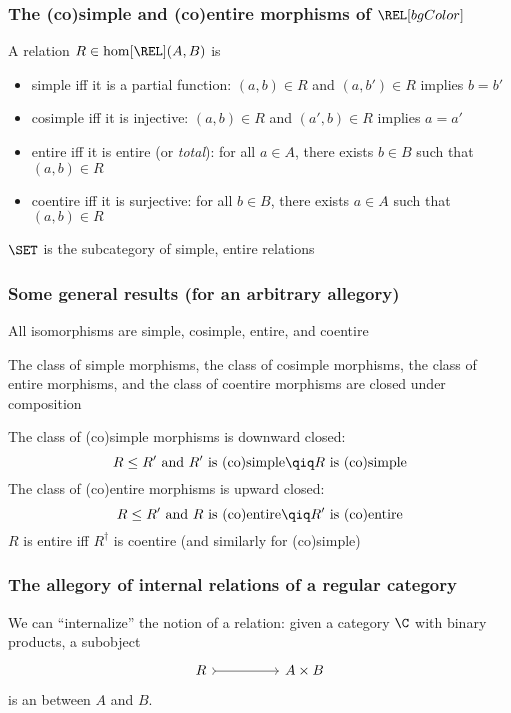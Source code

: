 {    \begin{frame}
        \frametitle{The (co)simple and (co)entire morphisms of $\REL[bgColor]$}
         A relation $R\in\hom[\REL](A,B)$ is\pause
        \begin{itemize}
            \item simple iff it is a partial function: $(a,b)\in R$ and $(a,b')\in R$ implies $b=b'$\pause
            \item cosimple iff it is injective: $(a,b)\in R$ and $(a',b)\in R$ implies $a=a'$\pause
            \item entire iff it is entire (or \textit{total}): for all $a\in A$, there exists $b\in B$ such that $(a,b)\in R$\pause
            \item coentire iff it is surjective: for all $b\in B$, there exists $a\in A$ such that $(a,b)\in R$
        \end{itemize}\pause
         $\SET$ is the subcategory of simple, entire relations
    \end{frame}

    \begin{frame}
        \frametitle{Some general results (for an arbitrary allegory)}\pause
         All isomorphisms are simple, cosimple, entire, and coentire\pause

         The class of simple morphisms, the class of cosimple morphisms, the class of entire morphisms, and the class of coentire morphisms are closed under composition\pause

         The class of (co)simple morphisms is downward closed:
            \[ R\leq R'\text{ and } R'\text{ is (co)simple} \qiq R\text{ is (co)simple} \]\pause%
        \hspace{-0.17cm} The class of (co)entire morphisms is upward closed:
            \[ R\leq R'\text{ and } R\text{ is (co)entire} \qiq R'\text{ is (co)entire} \]\pause%
        \hspace{-0.17cm} $R$ is entire iff $R^{\dagger}$ is coentire (and similarly for (co)simple)
    \end{frame}

    \begin{frame}[fragile]
        \frametitle{The allegory of internal relations of a regular category}

        We can ``internalize'' the notion of a relation: \pause given a category $\C$ with binary products, a subobject
        \[ \begin{tikzcd}[column sep=huge] R \arrow[rightarrowtail]{r}{} & A\times B \end{tikzcd}\]
        is an  between $A$ and $B$.\pause


\end{frame}}
